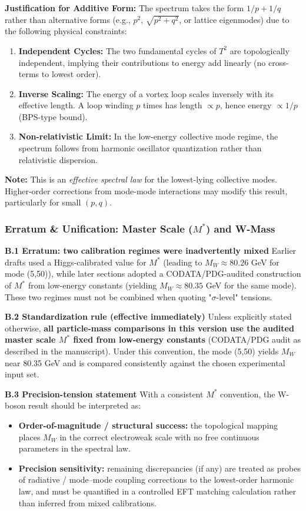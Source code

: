 \documentclass[a4paper,12pt]{article}
\begin{document}
\textbf{Justification for Additive Form:}
The spectrum takes the form $1/p + 1/q$ rather than alternative forms (e.g., $p^2$, $\sqrt{p^2+q^2}$, or lattice eigenmodes) due to the following physical constraints:
\begin{enumerate}
\item \textbf{Independent Cycles:} The two fundamental cycles of $T^2$ are topologically independent, implying their contributions to energy add linearly (no cross-terms to lowest order).
\item \textbf{Inverse Scaling:} The energy of a vortex loop scales inversely with its effective length. A loop winding $p$ times has length $\propto p$, hence energy $\propto 1/p$ (BPS-type bound).
\item \textbf{Non-relativistic Limit:} In the low-energy collective mode regime, the spectrum follows from harmonic oscillator quantization rather than relativistic dispersion.
\end{enumerate}

\textbf{Note:} This is an \emph{effective spectral law} for the lowest-lying collective modes. Higher-order corrections from mode-mode interactions may modify this result, particularly for small $(p,q)$.


\subsubsection{Erratum \& Unification: Master Scale ($M^*$) and W-Mass}

\textbf{B.1 Erratum: two calibration regimes were inadvertently mixed}
Earlier drafts used a Higgs-calibrated value for $M^*$ (leading to $M_W \approx 80.26$ GeV for mode (5,50)), while later sections adopted a CODATA/PDG-audited construction of $M^*$ from low-energy constants (yielding $M_W \approx 80.35$ GeV for the same mode). These two regimes must not be combined when quoting "$\sigma$-level" tensions.

\textbf{B.2 Standardization rule (effective immediately)}
Unless explicitly stated otherwise, \textbf{all particle-mass comparisons in this version use the audited master scale $M^*$ fixed from low-energy constants} (CODATA/PDG audit as described in the manuscript). Under this convention, the mode (5,50) yields $M_W$ near 80.35 GeV and is compared consistently against the chosen experimental input set.

\textbf{B.3 Precision-tension statement}
With a consistent $M^*$ convention, the W-boson result should be interpreted as:
\begin{itemize}
    \item \textbf{Order-of-magnitude / structural success:} the topological mapping places $M_W$ in the correct electroweak scale with no free continuous parameters in the spectral law.
    \item \textbf{Precision sensitivity:} remaining discrepancies (if any) are treated as probes of radiative / mode–mode coupling corrections to the lowest-order harmonic law, and must be quantified in a controlled EFT matching calculation rather than inferred from mixed calibrations.
\end{itemize}
\end{document}
